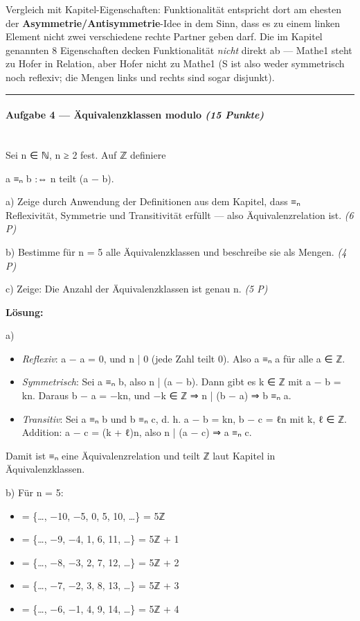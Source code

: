 \documentclass[11pt, a4paper]{article}
\begin{document}
Vergleich mit Kapitel-Eigenschaften: Funktionalität entspricht dort am ehesten der \textbf{Asymmetrie/Antisymmetrie}-Idee in dem Sinn, dass es zu einem linken Element nicht zwei verschiedene rechte Partner geben darf. Die im Kapitel genannten 8 Eigenschaften decken Funktionalität \textit{nicht} direkt ab — Mathe1 steht zu Hofer in Relation, aber Hofer nicht zu Mathe1 (S ist also weder symmetrisch noch reflexiv; die Mengen links und rechts sind sogar disjunkt).



\noindent\textcolor{rulegray}{\rule{\linewidth}{0.4pt}}


\paragraph{Aufgabe 4 — Äquivalenzklassen modulo \textit{(15 Punkte)}}\mbox{}\\[2pt]

Sei n ∈ ℕ, n ≥ 2 fest. Auf ℤ definiere

a ≡ₙ b :⇔ n teilt (a − b).


a) Zeige durch Anwendung der Definitionen aus dem Kapitel, dass ≡ₙ Reflexivität, Symmetrie und Transitivität erfüllt — also Äquivalenzrelation ist. \textit{(6 P)}

b) Bestimme für n = 5 alle Äquivalenzklassen und beschreibe sie als Mengen. \textit{(4 P)}

c) Zeige: Die Anzahl der Äquivalenzklassen ist genau n. \textit{(5 P)}


\textbf{Lösung:}


a)

\begin{itemize}
  \item \textit{Reflexiv}: a − a = 0, und n | 0 (jede Zahl teilt 0). Also a ≡ₙ a für alle a ∈ ℤ.
  \item \textit{Symmetrisch}: Sei a ≡ₙ b, also n | (a − b). Dann gibt es k ∈ ℤ mit a − b = kn. Daraus b − a = −kn, und −k ∈ ℤ ⇒ n | (b − a) ⇒ b ≡ₙ a.
  \item \textit{Transitiv}: Sei a ≡ₙ b und b ≡ₙ c, d. h. a − b = kn, b − c = ℓn mit k, ℓ ∈ ℤ. Addition: a − c = (k + ℓ)n, also n | (a − c) ⇒ a ≡ₙ c.
\end{itemize}

Damit ist ≡ₙ eine Äquivalenzrelation und teilt ℤ laut Kapitel in Äquivalenzklassen.


b) Für n = 5:

\begin{itemize}
  \item [0] = \{…, −10, −5, 0, 5, 10, …\} = 5ℤ
  \item [1] = \{…, −9, −4, 1, 6, 11, …\} = 5ℤ + 1
  \item [2] = \{…, −8, −3, 2, 7, 12, …\} = 5ℤ + 2
  \item [3] = \{…, −7, −2, 3, 8, 13, …\} = 5ℤ + 3
  \item [4] = \{…, −6, −1, 4, 9, 14, …\} = 5ℤ + 4
\end{itemize}
\end{document}
